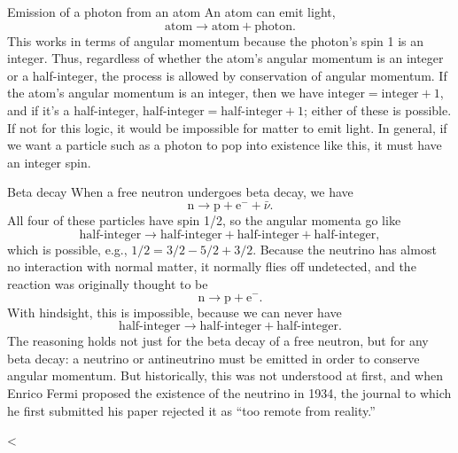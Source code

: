 \begin{eg}{Emission of a photon from an atom}
An atom can emit light,
\begin{equation*}
  \text{atom} \rightarrow \text{atom}+\text{photon}.
\end{equation*}
This works in terms of angular momentum because the photon's spin 1 is an integer.
Thus, regardless of whether the atom's angular momentum is an integer or a half-integer,
the process is allowed by conservation of angular momentum. If the atom's angular momentum
is an integer, then we have $\text{integer}=\text{integer}+1$, and if it's
a half-integer, $\text{half-integer}=\text{half-integer}+1$; either of these is possible.
If not for this logic, it would be impossible for matter to emit light. In general,
if we want a particle such as a photon to pop into existence like this, it must
have an integer spin.
\end{eg}

\begin{eg}{Beta decay}
When a free neutron undergoes beta decay, we have
\begin{equation*}
  \text{n} \rightarrow \text{p}+\text{e}^-+\bar{\nu}.
\end{equation*}
All four of these particles have spin 1/2, so the angular momenta go like
\begin{equation*}
  \text{half-integer} \rightarrow \text{half-integer}+\text{half-integer}+\text{half-integer},
\end{equation*}
which is possible, e.g., $1/2=3/2-5/2+3/2$. Because the neutrino has almost no interaction with
normal matter, it normally flies off undetected, and the reaction was originally thought to be
\begin{equation*}
  \text{n} \rightarrow \text{p}+\text{e}^-.
\end{equation*}
With hindsight, this is impossible, because we can never have
\begin{equation*}
  \text{half-integer} \rightarrow \text{half-integer}+\text{half-integer}.
\end{equation*}
The reasoning holds not just for the beta decay of a free neutron, but for any beta decay: a neutrino or antineutrino
must be emitted in order to conserve angular momentum.
But historically, this was not understood at first, and when Enrico Fermi proposed the
existence of the neutrino in 1934, the journal to which he first submitted his paper
rejected it as ``too remote from reality.''
\end{eg}

<%
